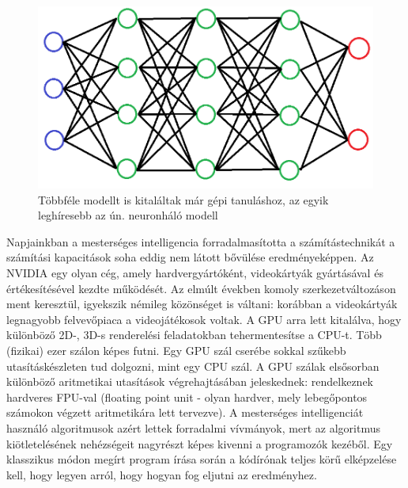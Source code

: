 \begin{figure}[ht!]
	\centering
	\includegraphics[width=150mm, keepaspectratio]{figures/neurons.png}
	\caption{Többféle modellt is kitaláltak már gépi tanuláshoz, az egyik leghíresebb az ún. neuronháló modell }
\end{figure}
Napjainkban a mesterséges intelligencia forradalmasította a számítástechnikát a számítási kapacitások soha eddig nem látott bővülése eredményeképpen. Az NVIDIA egy olyan cég, amely hardvergyártóként, videokártyák gyártásával és értékesítésével kezdte működését. Az elmúlt években komoly szerkezetváltozáson ment keresztül, igyekszik némileg közönséget is váltani: korábban a videokártyák legnagyobb felvevőpiaca a videojátékosok voltak. A GPU arra lett kitalálva, hogy különböző 2D-, 3D-s renderelési feladatokban tehermentesítse a CPU-t. Több (fizikai) ezer szálon képes futni. Egy GPU szál cserébe sokkal szűkebb utasításkészleten tud dolgozni, mint egy CPU szál. A GPU szálak elsősorban különböző aritmetikai utasítások végrehajtásában jeleskednek: rendelkeznek hardveres FPU-val (floating point unit - olyan hardver, mely lebegőpontos számokon végzett aritmetikára lett tervezve). 
A mesterséges intelligenciát használó algoritmusok azért lettek forradalmi vívmányok, mert az algoritmus kiötletelésének nehézségeit nagyrészt képes kivenni a programozók kezéből. Egy klasszikus módon megírt program írása során a kódírónak teljes körű elképzelése kell, hogy legyen arról, hogy hogyan fog eljutni az eredményhez. 



